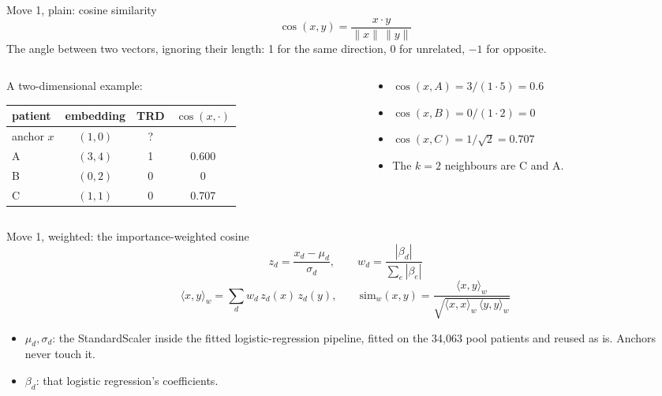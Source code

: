 \documentclass[aspectratio=169]{beamer}
\begin{document}
\begin{frame}{Move 1, plain: cosine similarity}
  \[
    \cos(x,y) = \frac{x\cdot y}{\lVert x\rVert\,\lVert y\rVert}
  \]
  The angle between two vectors, ignoring their length: 1 for the same direction, 0 for unrelated, $-1$ for opposite.

  \vspace{0.6em}
  \begin{columns}[T]
    \begin{column}{0.5\textwidth}
      A two-dimensional example:\\[0.4em]
      \begin{tabular}{lccc}
        \toprule
        patient & embedding & TRD & $\cos(x,\cdot)$ \\
        \midrule
        anchor $x$ & $(1,0)$ & ? & \\
        A & $(3,4)$ & 1 & 0.600 \\
        B & $(0,2)$ & 0 & 0 \\
        C & $(1,1)$ & 0 & 0.707 \\
        \bottomrule
      \end{tabular}
    \end{column}
    \begin{column}{0.45\textwidth}
      \begin{itemize}
        \item $\cos(x,A) = 3/(1\cdot 5) = 0.6$
        \item $\cos(x,B) = 0/(1\cdot 2) = 0$
        \item $\cos(x,C) = 1/\sqrt{2} = 0.707$
        \item The $k=2$ neighbours are C and A.
      \end{itemize}
    \end{column}
  \end{columns}
\end{frame}

\begin{frame}{Move 1, weighted: the importance-weighted cosine}
  \[
    z_d = \frac{x_d-\mu_d}{\sigma_d}, \qquad
    w_d = \frac{|\beta_d|}{\sum_e |\beta_e|}
  \]
  \[
    \langle x,y\rangle_w = \sum_d w_d\, z_d(x)\, z_d(y), \qquad
    \mathrm{sim}_w(x,y) = \frac{\langle x,y\rangle_w}{\sqrt{\langle x,x\rangle_w\,\langle y,y\rangle_w}}
  \]
  \begin{itemize}
    \item $\mu_d,\sigma_d$: the StandardScaler inside the fitted logistic-regression pipeline, fitted on the 34{,}063 pool patients and reused as is. Anchors never touch it.
    \item $\beta_d$: that logistic regression's coefficients.
  \end{itemize}
\end{frame}
\end{document}
